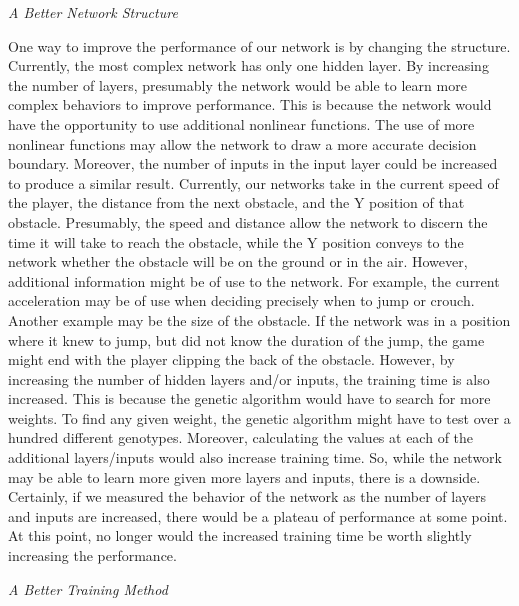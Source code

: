 \documentclass[12pt]{article}
\begin{document}
\begin{flushleft}
\noindent\emph{A Better Network Structure}

One way to improve the performance of our network is by changing the structure. Currently, the most complex network has only one hidden layer. By increasing the number of layers, presumably the network would be able to learn more complex behaviors to improve performance. This is because the network would have the opportunity to use additional nonlinear functions. The use of more nonlinear functions may allow the network to draw a more accurate decision boundary. 
Moreover, the number of inputs in the input layer could be increased to produce a similar  result. Currently, our networks take in the current speed of the player, the distance from the next obstacle, and the Y position of that obstacle. Presumably, the speed and distance allow the network to discern the time it will take to reach the obstacle, while the Y position conveys to the network whether the obstacle will be on the ground or in the air. However, additional information might be of use to the network. For example, the current acceleration may be of use when deciding precisely when to jump or crouch. Another example may be the size of the obstacle. If the network was in a position where it knew to jump, but did not know the duration of the jump, the game might end with the player clipping the back of the obstacle. 
  However, by increasing the number of hidden layers and/or inputs, the training time is also increased. This is because the genetic algorithm would have to search for more weights. To find any given weight, the genetic algorithm might have to test over a hundred different genotypes. Moreover, calculating the values at each of the additional layers/inputs would also increase training time. So, while the network may be able to learn more given more layers and inputs, there is a downside. Certainly, if we measured the behavior of the network as the number of layers and inputs are increased, there would be a plateau of performance at some point. At this point, no longer would the increased training time be worth slightly increasing the performance.

\hfill

\noindent\emph{A Better Training Method}


\end{flushleft}
\end{document}
